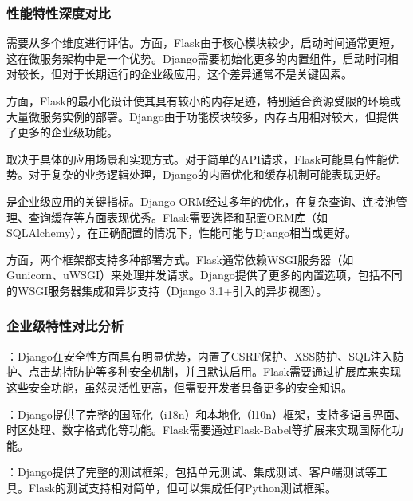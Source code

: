 \hypertarget{ux6027ux80fdux7279ux6027ux6df1ux5ea6ux5bf9ux6bd4}{%
\subsubsection{性能特性深度对比}\label{ux6027ux80fdux7279ux6027ux6df1ux5ea6ux5bf9ux6bd4}}

需要从多个维度进行评估。方面，Flask由于核心模块较少，启动时间通常更短，这在微服务架构中是一个优势。Django需要初始化更多的内置组件，启动时间相对较长，但对于长期运行的企业级应用，这个差异通常不是关键因素。

方面，Flask的最小化设计使其具有较小的内存足迹，特别适合资源受限的环境或大量微服务实例的部署。Django由于功能模块较多，内存占用相对较大，但提供了更多的企业级功能。

取决于具体的应用场景和实现方式。对于简单的API请求，Flask可能具有性能优势。对于复杂的业务逻辑处理，Django的内置优化和缓存机制可能表现更好。

是企业级应用的关键指标。Django ORM经过多年的优化，在复杂查询、连接池管理、查询缓存等方面表现优秀。Flask需要选择和配置ORM库（如SQLAlchemy），在正确配置的情况下，性能可能与Django相当或更好。

方面，两个框架都支持多种部署方式。Flask通常依赖WSGI服务器（如Gunicorn、uWSGI）来处理并发请求。Django提供了更多的内置选项，包括不同的WSGI服务器集成和异步支持（Django 3.1+引入的异步视图）。

\hypertarget{ux4f01ux4e1aux7ea7ux7279ux6027ux5bf9ux6bd4ux5206ux6790}{%
\subsubsection{企业级特性对比分析}\label{ux4f01ux4e1aux7ea7ux7279ux6027ux5bf9ux6bd4ux5206ux6790}}

：Django在安全性方面具有明显优势，内置了CSRF保护、XSS防护、SQL注入防护、点击劫持防护等多种安全机制，并且默认启用。Flask需要通过扩展库来实现这些安全功能，虽然灵活性更高，但需要开发者具备更多的安全知识。

：Django提供了完整的国际化（i18n）和本地化（l10n）框架，支持多语言界面、时区处理、数字格式化等功能。Flask需要通过Flask-Babel等扩展来实现国际化功能。

：Django提供了完整的测试框架，包括单元测试、集成测试、客户端测试等工具。Flask的测试支持相对简单，但可以集成任何Python测试框架。

